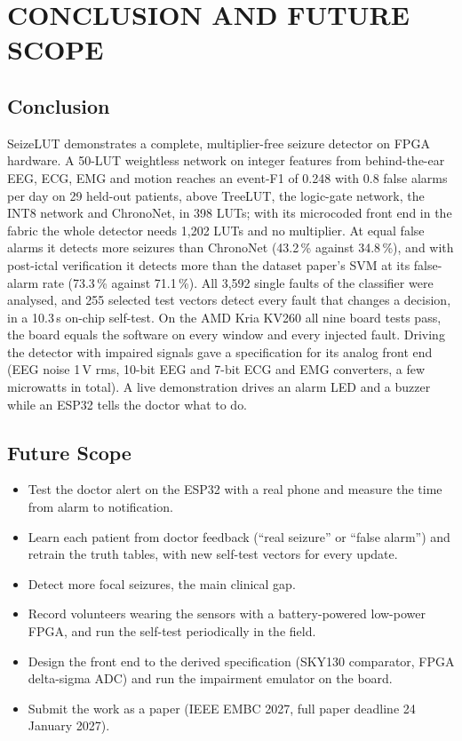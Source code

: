 \chapter{CONCLUSION AND FUTURE SCOPE}\label{ch:concl}

\section{Conclusion}

SeizeLUT demonstrates a complete, multiplier-free seizure detector on FPGA hardware. A 50-LUT weightless network on
integer features from behind-the-ear EEG, ECG, EMG and motion reaches an event-F1 of 0.248 with 0.8 false alarms per
day on 29 held-out patients, above TreeLUT, the logic-gate network, the INT8 network and ChronoNet, in 398 LUTs; with
its microcoded front end in the fabric the whole detector needs 1,202 LUTs and no multiplier. At equal false alarms it
detects more seizures than ChronoNet (43.2\,\% against 34.8\,\%), and with post-ictal verification it detects more
than the dataset paper's SVM at its false-alarm rate (73.3\,\% against 71.1\,\%). All 3,592 single faults of the
classifier were analysed, and 255 selected test vectors detect every fault that changes a decision, in a 10.3\,\textmu s
on-chip self-test. On the AMD Kria KV260 all nine board tests pass, the board equals the software on every window and
every injected fault. Driving the detector with impaired signals gave a specification for its analog front end (EEG noise
1\,\textmu V rms, 10-bit EEG and 7-bit ECG and EMG converters, a few microwatts in total). A live demonstration drives an alarm LED and a buzzer while an ESP32 tells the doctor what to
do.

\section{Future Scope}

\begin{itemize}
\item Test the doctor alert on the ESP32 with a real phone and measure the time from alarm to notification.
\item Learn each patient from doctor feedback (``real seizure'' or ``false alarm'') and retrain the truth tables, with
  new self-test vectors for every update.
\item Detect more focal seizures, the main clinical gap.
\item Record volunteers wearing the sensors with a battery-powered low-power FPGA, and run the self-test periodically
  in the field.
\item Design the front end to the derived specification (SKY130 comparator, FPGA delta-sigma ADC) and run the
  impairment emulator on the board.
\item Submit the work as a paper (IEEE EMBC 2027, full paper deadline 24 January 2027).
\end{itemize}
